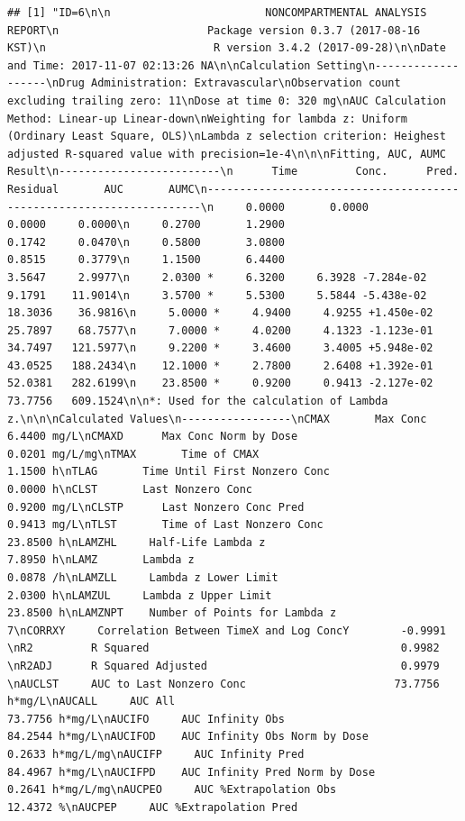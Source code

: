 \documentclass[12pt,]{krantz}
\theoremstyle{definition}
\theoremstyle{definition}
\theoremstyle{definition}
\theoremstyle{remark}
\begin{document}
\begin{verbatim}
## [1] "ID=6\n\n                        NONCOMPARTMENTAL ANALYSIS REPORT\n                       Package version 0.3.7 (2017-08-16 KST)\n                          R version 3.4.2 (2017-09-28)\n\nDate and Time: 2017-11-07 02:13:26 NA\n\nCalculation Setting\n-------------------\nDrug Administration: Extravascular\nObservation count excluding trailing zero: 11\nDose at time 0: 320 mg\nAUC Calculation Method: Linear-up Linear-down\nWeighting for lambda z: Uniform (Ordinary Least Square, OLS)\nLambda z selection criterion: Heighest adjusted R-squared value with precision=1e-4\n\n\nFitting, AUC, AUMC Result\n-------------------------\n      Time         Conc.      Pred.   Residual       AUC       AUMC\n---------------------------------------------------------------------\n     0.0000       0.0000                           0.0000     0.0000\n     0.2700       1.2900                           0.1742     0.0470\n     0.5800       3.0800                           0.8515     0.3779\n     1.1500       6.4400                           3.5647     2.9977\n     2.0300 *     6.3200     6.3928 -7.284e-02     9.1791    11.9014\n     3.5700 *     5.5300     5.5844 -5.438e-02    18.3036    36.9816\n     5.0000 *     4.9400     4.9255 +1.450e-02    25.7897    68.7577\n     7.0000 *     4.0200     4.1323 -1.123e-01    34.7497   121.5977\n     9.2200 *     3.4600     3.4005 +5.948e-02    43.0525   188.2434\n    12.1000 *     2.7800     2.6408 +1.392e-01    52.0381   282.6199\n    23.8500 *     0.9200     0.9413 -2.127e-02    73.7756   609.1524\n\n*: Used for the calculation of Lambda z.\n\n\nCalculated Values\n-----------------\nCMAX       Max Conc                                        6.4400 mg/L\nCMAXD      Max Conc Norm by Dose                           0.0201 mg/L/mg\nTMAX       Time of CMAX                                    1.1500 h\nTLAG       Time Until First Nonzero Conc                   0.0000 h\nCLST       Last Nonzero Conc                               0.9200 mg/L\nCLSTP      Last Nonzero Conc Pred                          0.9413 mg/L\nTLST       Time of Last Nonzero Conc                      23.8500 h\nLAMZHL     Half-Life Lambda z                              7.8950 h\nLAMZ       Lambda z                                        0.0878 /h\nLAMZLL     Lambda z Lower Limit                            2.0300 h\nLAMZUL     Lambda z Upper Limit                           23.8500 h\nLAMZNPT    Number of Points for Lambda z                   7\nCORRXY     Correlation Between TimeX and Log ConcY        -0.9991 \nR2         R Squared                                       0.9982 \nR2ADJ      R Squared Adjusted                              0.9979 \nAUCLST     AUC to Last Nonzero Conc                       73.7756 h*mg/L\nAUCALL     AUC All                                        73.7756 h*mg/L\nAUCIFO     AUC Infinity Obs                               84.2544 h*mg/L\nAUCIFOD    AUC Infinity Obs Norm by Dose                   0.2633 h*mg/L/mg\nAUCIFP     AUC Infinity Pred                              84.4967 h*mg/L\nAUCIFPD    AUC Infinity Pred Norm by Dose                  0.2641 h*mg/L/mg\nAUCPEO     AUC %Extrapolation Obs                         12.4372 %\nAUCPEP     AUC %Extrapolation Pred                        
\end{verbatim}
\end{document}

